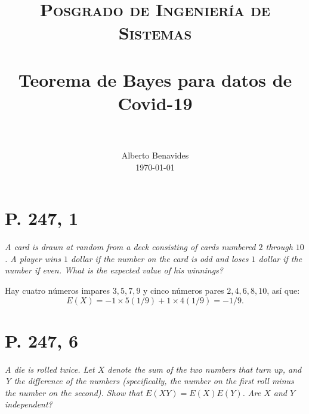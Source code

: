 \documentclass[paper=leter, fontsize=11pt]{scrartcl}
\title{
		\usefont{OT1}{bch}{b}{n}
		\normalfont \normalsize \textsc{Posgrado de Ingeniería de Sistemas} \\ [25pt]
		\horrule{0.5pt} \\[0.4cm]
		\huge Teorema de Bayes para datos de Covid-19 \\
		\horrule{2pt} \\[0.5cm]
}
\author{
		\normalfont 								\normalsize
        Alberto Benavides\\[-3pt]		\normalsize
        \today
}
\date{}
\numberwithin{equation}{section}		%
\numberwithin{figure}{section}			%
\numberwithin{table}{section}				%
\begin{document}
 
\maketitle

\section*{P. 247, 1}
\emph{A card is drawn at random from a deck consisting of cards numbered $2$ through $10$. A player wins $1$ dollar if the number on the card is odd and loses $1$ dollar if the number if even. What is the expected value of his winnings?}

Hay cuatro números impares $3, 5, 7, 9$ y cinco números pares $2, 4, 6, 8, 10$, así que:
\begin{equation*}
    E(X) = -1 \times 5 (1/9) + 1 \times 4 (1/9) = -1/9.
\end{equation*}

\section*{P. 247, 6}
\emph{A die is rolled twice. Let $X$ denote the sum of the two numbers that turn up, and Y the difference of the numbers (specifically, the number on the first roll minus the number on the second). Show that $E(X Y) = E(X)E(Y )$. Are $X$ and $Y$ independent?}
\end{document}
